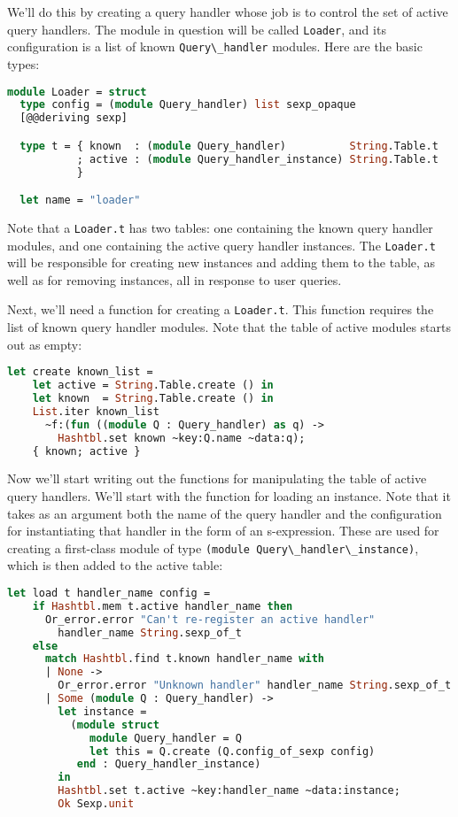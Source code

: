 We'll do this by creating a query handler whose job is to control the
set of active query handlers. The module in question will be called
\passthrough{\lstinline!Loader!}, and its configuration is a list of
known \passthrough{\lstinline!Query\_handler!} modules. Here are the
basic types:

\begin{lstlisting}[language=Caml]
module Loader = struct
  type config = (module Query_handler) list sexp_opaque
  [@@deriving sexp]

  type t = { known  : (module Query_handler)          String.Table.t
           ; active : (module Query_handler_instance) String.Table.t
           }

  let name = "loader"
\end{lstlisting}

Note that a \passthrough{\lstinline!Loader.t!} has two tables: one
containing the known query handler modules, and one containing the
active query handler instances. The \passthrough{\lstinline!Loader.t!}
will be responsible for creating new instances and adding them to the
table, as well as for removing instances, all in response to user
queries.

Next, we'll need a function for creating a
\passthrough{\lstinline!Loader.t!}. This function requires the list of
known query handler modules. Note that the table of active modules
starts out as empty:

\begin{lstlisting}[language=Caml]
let create known_list =
    let active = String.Table.create () in
    let known  = String.Table.create () in
    List.iter known_list
      ~f:(fun ((module Q : Query_handler) as q) ->
        Hashtbl.set known ~key:Q.name ~data:q);
    { known; active }
\end{lstlisting}

Now we'll start writing out the functions for manipulating the table of
active query handlers. We'll start with the function for loading an
instance. Note that it takes as an argument both the name of the query
handler and the configuration for instantiating that handler in the form
of an s-expression. These are used for creating a first-class module of
type \passthrough{\lstinline!(module Query\_handler\_instance)!}, which
is then added to the active table:

\begin{lstlisting}[language=Caml]
let load t handler_name config =
    if Hashtbl.mem t.active handler_name then
      Or_error.error "Can't re-register an active handler"
        handler_name String.sexp_of_t
    else
      match Hashtbl.find t.known handler_name with
      | None ->
        Or_error.error "Unknown handler" handler_name String.sexp_of_t
      | Some (module Q : Query_handler) ->
        let instance =
          (module struct
             module Query_handler = Q
             let this = Q.create (Q.config_of_sexp config)
           end : Query_handler_instance)
        in
        Hashtbl.set t.active ~key:handler_name ~data:instance;
        Ok Sexp.unit
\end{lstlisting}

